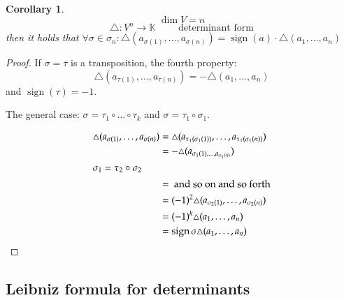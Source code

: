 \documentclass{article}
\newtheorem{corollary}{Corollary}  \numberwithin{corollary}{section}
\DeclareMathOperator{\sign}{sign}
\begin{document}
\begin{corollary} %
  \label{cor:719}
  \[ \dim V = n \]
  \[ \triangle: V^n \to \mathbb K \qquad \text{ determinant form} \]
  then it holds that $\forall \sigma \in \sigma_n: \triangle(a_{\sigma(1)}, \dots, a_{\sigma(n)}) = \sign(a) \cdot \triangle(a_1, \dots, a_n)$
\end{corollary}

\begin{proof}
  If $\sigma = \tau$ is a transposition, the fourth property:
  \[ \triangle(a_{\tau(1)}, \dots, a_{\tau(n)}) = -\triangle(a_1, \dots, a_n) \]
  and $\sign(\tau) = -1$.

  The general case: $\sigma = \tau_1 \circ \dots \circ \tau_k$ and $\sigma = \tau_1 \circ \sigma_1$.

  \begin{align*}
    \triangle(a_{\sigma(1)}, \dots, a_{\sigma(n)}) &= \triangle(a_{\tau_1(\sigma_1(1))}, \dots, a_{\tau_1(\sigma_1(n))}) \\
      &= -\triangle(a_{\sigma_1(1), \dots, a_{\sigma_1(n)}}) \\
    \intertext{$\sigma_1 = \tau_2 \circ \sigma_2$}
      &= \text{ and so on and so forth} \\
      &= (-1)^2 \triangle(a_{\sigma_2(1)}, \dots, a_{\sigma_2(n)}) \\
      &= (-1)^k \triangle (a_1, \dots, a_n) \\
      &= \sign\sigma \triangle(a_1, \dots, a_n)
  \end{align*}
\end{proof}

\subsection{Leibniz formula for determinants}
\end{document}
